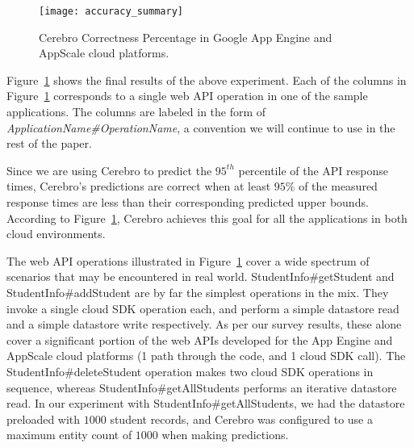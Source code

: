 \begin{figure}
\centering
\texttt{[image: accuracy\_summary]}
\caption{Cerebro Correctness Percentage in Google App Engine and AppScale cloud platforms.}
\label{fig:accuracy_summary}
\end{figure}

Figure~\ref{fig:accuracy_summary} shows the final results of the above experiment.
Each of the columns in Figure~\ref{fig:accuracy_summary} corresponds to a single web API operation in 
one of the sample applications. The columns are labeled in the form of \textit{ApplicationName\#OperationName}, a convention 
we will continue to use in the rest of the paper. %

Since we are using Cerebro to predict the $95^{th}$ percentile of the API
response times, Cerebro's predictions are correct when at 
least $95\%$ of the measured response times are
less than their corresponding predicted upper bounds. According to
Figure~\ref{fig:accuracy_summary}, Cerebro achieves this goal for all the
applications in both cloud environments. 

The web API operations illustrated in Figure~\ref{fig:accuracy_summary} cover
a wide spectrum of scenarios that may be encountered in real world.
StudentInfo\#getStudent and StudentInfo\#addStudent are by far the simplest
operations in the mix. They invoke a single cloud SDK operation each, and
perform a simple datastore read and a simple datastore write respectively. As
per our survey results, these alone cover a significant portion of the web
APIs developed for the App Engine and AppScale cloud platforms (1 path through
the code, and 1 cloud SDK call).  The StudentInfo\#deleteStudent operation
makes two cloud SDK operations in sequence, whereas
StudentInfo\#getAllStudents performs an iterative datastore read.  In our
experiment with StudentInfo\#getAllStudents, we had the datastore preloaded
with $1000$ student records, and Cerebro was configured to use a maximum entity
count of $1000$ when making predictions.

